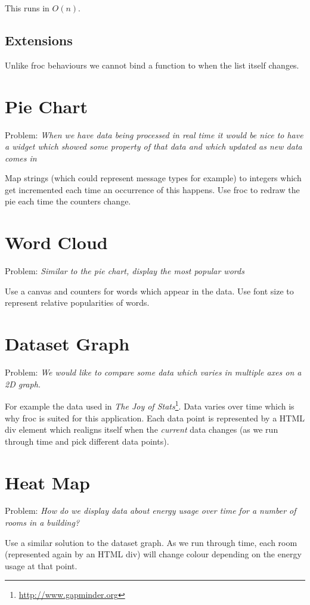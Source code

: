 This runs in \texttt{$O(n)$}.

\subsection{Extensions}
Unlike froc behaviours we cannot bind a function to when the list itself changes.

\section{Pie Chart}
Problem: \emph{When we have data being processed in real time it would be nice to have a widget which showed some property of that data and which updated as new data comes in}

Map strings (which could represent message types for example) to integers which get incremented each time an occurrence of this happens. Use froc to redraw the pie each time the counters change.

\section{Word Cloud}
Problem: \emph{Similar to the pie chart, display the most popular words}

Use a canvas and counters for words which appear in the data. Use font size to represent relative popularities of words.

\section{Dataset Graph}
Problem: \emph{We would like to compare some data which varies in multiple axes on a 2D graph.}

For example the data used in \emph{The Joy of Stats}\footnote{\url{http://www.gapminder.org}}. Data varies over time which is why froc is suited for this application. Each data point is represented by a HTML div element which realigns itself when the \emph{current} data changes (as we run through time and pick different data points).

\section{Heat Map}
Problem: \emph{How do we display data about energy usage over time for a number of rooms in a building?}

Use a similar solution to the dataset graph. As we run through time, each room (represented again by an HTML div) will change colour depending on the energy usage at that point.
